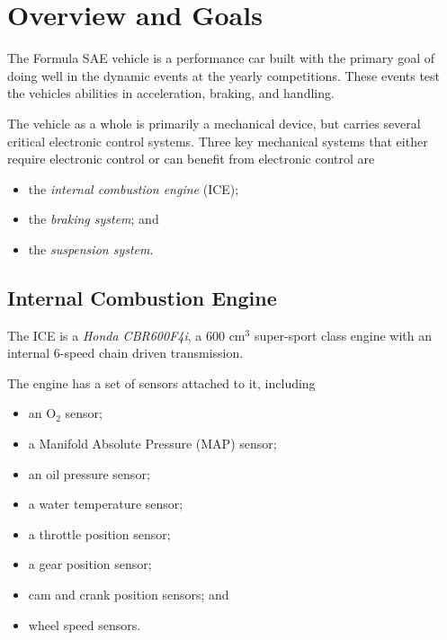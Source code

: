 %
%
%
%

\section{Overview and Goals}

The Formula SAE vehicle is a performance car built with the primary goal of doing well in the 
dynamic events at the yearly competitions. These events test the vehicles abilities in acceleration, 
braking, and handling.

The vehicle as a whole is primarily a mechanical device, but carries several critical electronic 
control systems. Three key mechanical systems that either require electronic control or can benefit 
from electronic control are

\begin{itemize}
\item the \emph{internal combustion engine} (ICE); 
\item the \emph{braking system}; and
\item the \emph{suspension system}.
\end{itemize}

\subsection{Internal Combustion Engine}


The ICE is a \emph{Honda CBR600F4i}, a 600 cm$^3$ super-sport class engine with an internal 6-speed 
chain driven transmission. 

The engine has a set of sensors attached to it, including

\begin{itemize}
\item an O$_{2}$ sensor;
\item a Manifold Absolute Pressure (MAP) sensor; 
\item an oil pressure sensor;
\item a water temperature sensor;
\item a throttle position sensor;
\item a gear position sensor;
\item cam and crank position sensors; and
\item wheel speed sensors.
\end{itemize}


